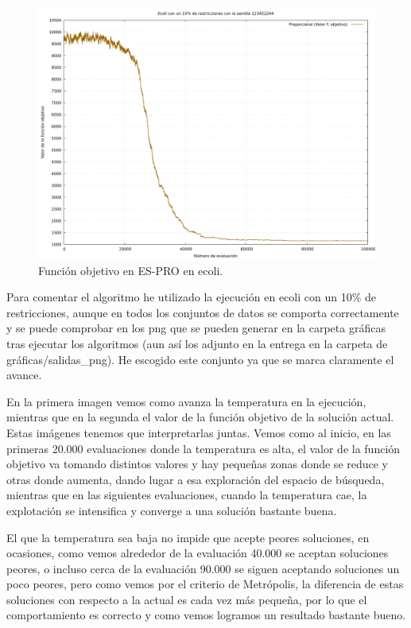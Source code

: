 \documentclass[12pt, spanish]{article}
\begin{document}
\begin{figure}[H]
	\centering
	\includegraphics[scale = 0.35]{es-ecoli-10.png}
	
	\caption{Función objetivo en ES-PRO en ecoli.}
	\label{fig:es-cmp1}
\end{figure}


Para comentar el algoritmo he utilizado la ejecución en ecoli con un 10\% de restricciones, aunque en todos los conjuntos de datos se comporta correctamente y se puede comprobar en los png que se pueden generar en la carpeta gráficas tras ejecutar los algoritmos (aun así los adjunto en la entrega en la carpeta de gráficas/salidas\_png). He escogido este conjunto ya que se marca claramente el avance.

En la primera imagen vemos como avanza la temperatura en la ejecución, mientras que en la segunda el valor de la función objetivo de la solución actual. Estas imágenes tenemos que interpretarlas juntas. Vemos como al inicio, en las primeras 20.000 evaluaciones donde la temperatura es alta, el valor de la función objetivo va tomando distintos valores y hay pequeñas zonas donde se reduce y otras donde aumenta, dando lugar a esa exploración del espacio de búsqueda, mientras que en las siguientes evaluaciones, cuando la temperatura cae, la explotación se intensifica y converge a una solución bastante buena.

El que la temperatura sea baja no impide que acepte peores soluciones, en ocasiones, como vemos alrededor de la evaluación 40.000 se aceptan soluciones peores, o incluso cerca de la evaluación 90.000 se siguen aceptando soluciones un poco peores, pero como vemos por el criterio de Metrópolis, la diferencia de estas soluciones con respecto a la actual es cada vez más pequeña, por lo que el comportamiento es correcto y como vemos logramos un resultado bastante bueno.
\end{document}
